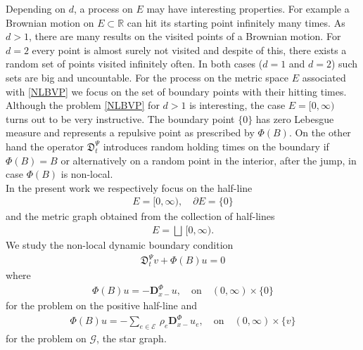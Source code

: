 \documentclass[11pt,a4paper]{article}
\theoremstyle{plain}
\theoremstyle{definition}
\theoremstyle{remark}
\begin{document}
	
	Depending on $d$, a process on $E$ may have interesting properties. For example a Brownian motion on $E \subset \mathbb{R}$ can hit its starting point infinitely many times. As $d>1$, there are many results on the visited points of a Brownian motion. For $d=2$ every point is almost surely not visited and despite of this, there exists a random set of points visited infinitely often. In both cases ($d=1$ and $d=2$) such sets are big and uncountable. For the process on  the metric space $E$ associated with \eqref{NLBVP} we focus on the set of boundary points with their hitting times. Although the problem \eqref{NLBVP} for $d>1$ is interesting, the case $E=[0, \infty)$ turns out to be very instructive. The boundary point $\{0\}$ has zero Lebesgue measure and represents a repulsive point as prescribed by $\Phi(B)$. On the other hand the operator $\mathfrak{D}^\Psi_t$ introduces random holding times on the boundary if $\Phi(B)=B$ or alternatively on a random point in the interior, after the jump, in case $\Phi(B)$ is non-local. \\   
	
	
	
	In the present work we respectively focus on the half-line 
	\begin{align*}
		E=[0, \infty), \quad \partial E = \{0\}
	\end{align*}
	and the metric graph obtained from the collection of half-lines
	\begin{align*}
		E = \bigsqcup \, [0, \infty).
	\end{align*}
	We study the non-local dynamic boundary condition 
	\begin{align*}
		\mathfrak{D}^\Psi_t v + \Phi(B) u = 0
	\end{align*}
	where
	\begin{align*}
		\Phi(B) u = - \mathbf{D}^\Phi_{x-} u, \quad \textrm{on} \quad (0, \infty) \times \{0\}
	\end{align*}
	for the problem on the positive half-line and
	\begin{align*}
		\Phi(B) u = - \sum_{e \in \mathcal{E}}\, \rho_e \mathbf{D}^\Phi_{x-} u_e, \quad \textrm{on} \quad (0,\infty) \times \{v\} 
	\end{align*}
	for the problem on $\mathcal{G}$, the star graph.\\
	
	
	
\end{document}
